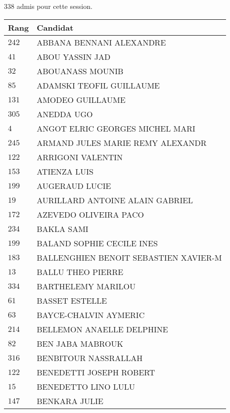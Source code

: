 



  $338$ admis pour cette session.

  \begin{xltabular}{\linewidth}{|l|X|}
    \hline
    \textbf{Rang} & \textbf{Candidat} \\
    \hline
    $242$ & ABBANA BENNANI ALEXANDRE \\
    \hline
    $41$ & ABOU YASSIN JAD \\
    \hline
    $32$ & ABOUANASS MOUNIB \\
    \hline
    $85$ & ADAMSKI TEOFIL GUILLAUME \\
    \hline
    $131$ & AMODEO GUILLAUME \\
    \hline
    $305$ & ANEDDA UGO \\
    \hline
    $4$ & ANGOT ELRIC GEORGES MICHEL MARI \\
    \hline
    $245$ & ARMAND JULES MARIE REMY ALEXANDR \\
    \hline
    $122$ & ARRIGONI VALENTIN \\
    \hline
    $153$ & ATIENZA LUIS \\
    \hline
    $199$ & AUGERAUD LUCIE \\
    \hline
    $19$ & AURILLARD ANTOINE ALAIN GABRIEL \\
    \hline
    $172$ & AZEVEDO OLIVEIRA PACO \\
    \hline
    $234$ & BAKLA SAMI \\
    \hline
    $199$ & BALAND SOPHIE CECILE INES \\
    \hline
    $183$ & BALLENGHIEN BENOIT SEBASTIEN XAVIER-M \\
    \hline
    $13$ & BALLU THEO PIERRE \\
    \hline
    $334$ & BARTHELEMY MARILOU \\
    \hline
    $61$ & BASSET ESTELLE \\
    \hline
    $63$ & BAYCE-CHALVIN AYMERIC \\
    \hline
    $214$ & BELLEMON ANAELLE DELPHINE \\
    \hline
    $82$ & BEN JABA MABROUK \\
    \hline
    $316$ & BENBITOUR NASSRALLAH \\
    \hline
    $122$ & BENEDETTI JOSEPH ROBERT \\
    \hline
    $15$ & BENEDETTO LINO LULU \\
    \hline
    $147$ & BENKARA JULIE \\

\end{xltabular}
